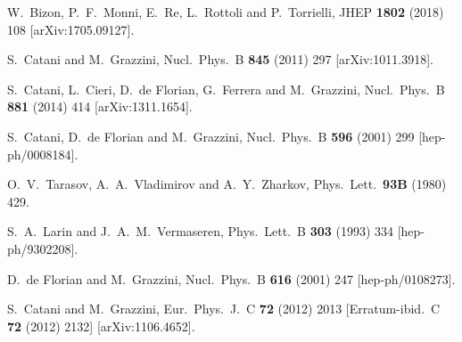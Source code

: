 \documentclass[12pt]{article}
\begin{document}
\begin{thebibliography}{99}
  W.~Bizon, P.~F.~Monni, E.~Re, L.~Rottoli and P.~Torrielli,
  JHEP {\bf 1802} (2018) 108
    [arXiv:1705.09127].

  
  S.~Catani and M.~Grazzini,
  Nucl.\ Phys.\ B {\bf 845} (2011) 297
[arXiv:1011.3918].

  S.~Catani, L.~Cieri, D.~de Florian, G.~Ferrera and M.~Grazzini,
  Nucl.\ Phys.\ B {\bf 881} (2014) 414
   [arXiv:1311.1654].
  
  S.~Catani, D.~de Florian and M.~Grazzini,
  Nucl.\ Phys.\  B {\bf 596} (2001) 299
[hep-ph/0008184].

  O.~V.~Tarasov, A.~A.~Vladimirov and A.~Y.~Zharkov,
  Phys.\ Lett.\  {\bf 93B} (1980) 429.
  
  S.~A.~Larin and J.~A.~M.~Vermaseren,
  Phys.\ Lett.\ B {\bf 303} (1993) 334
  [hep-ph/9302208].



  D.~de Florian and M.~Grazzini,
  Nucl.\ Phys.\  B {\bf 616} (2001) 247
[hep-ph/0108273].
 
  S.~Catani and M.~Grazzini,
  Eur.\ Phys.\ J.\ C {\bf 72} (2012) 2013
[Erratum-ibid.\ C {\bf 72} (2012) 2132]
[arXiv:1106.4652].



\end{thebibliography}
\end{document}
